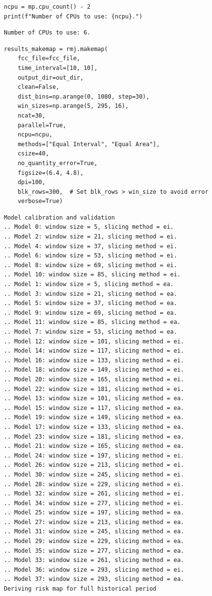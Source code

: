 \documentclass[paper=a4, 12pt, DIV=12]{scrartcl}
\begin{document}
\begin{verbatim}
ncpu = mp.cpu_count() - 2
print(f"Number of CPUs to use: {ncpu}.") 
\end{verbatim}

\begin{verbatim}
Number of CPUs to use: 6.
\end{verbatim}


\begin{verbatim}
results_makemap = rmj.makemap(
    fcc_file=fcc_file,
    time_interval=[10, 10],
    output_dir=out_dir,
    clean=False,
    dist_bins=np.arange(0, 1080, step=30),
    win_sizes=np.arange(5, 295, 16),
    ncat=30,
    parallel=True,
    ncpu=ncpu,
    methods=["Equal Interval", "Equal Area"],
    csize=40,
    no_quantity_error=True,
    figsize=(6.4, 4.8),
    dpi=100,
    blk_rows=300,  # Set blk_rows > win_size to avoid error
    verbose=True)
\end{verbatim}

\begin{verbatim}
Model calibration and validation
.. Model 0: window size = 5, slicing method = ei.
.. Model 2: window size = 21, slicing method = ei.
.. Model 4: window size = 37, slicing method = ei.
.. Model 6: window size = 53, slicing method = ei.
.. Model 8: window size = 69, slicing method = ei.
.. Model 10: window size = 85, slicing method = ei.
.. Model 1: window size = 5, slicing method = ea.
.. Model 3: window size = 21, slicing method = ea.
.. Model 5: window size = 37, slicing method = ea.
.. Model 9: window size = 69, slicing method = ea.
.. Model 11: window size = 85, slicing method = ea.
.. Model 7: window size = 53, slicing method = ea.
.. Model 12: window size = 101, slicing method = ei.
.. Model 14: window size = 117, slicing method = ei.
.. Model 16: window size = 133, slicing method = ei.
.. Model 18: window size = 149, slicing method = ei.
.. Model 20: window size = 165, slicing method = ei.
.. Model 22: window size = 181, slicing method = ei.
.. Model 13: window size = 101, slicing method = ea.
.. Model 15: window size = 117, slicing method = ea.
.. Model 19: window size = 149, slicing method = ea.
.. Model 17: window size = 133, slicing method = ea.
.. Model 23: window size = 181, slicing method = ea.
.. Model 21: window size = 165, slicing method = ea.
.. Model 24: window size = 197, slicing method = ei.
.. Model 26: window size = 213, slicing method = ei.
.. Model 30: window size = 245, slicing method = ei.
.. Model 28: window size = 229, slicing method = ei.
.. Model 32: window size = 261, slicing method = ei.
.. Model 34: window size = 277, slicing method = ei.
.. Model 25: window size = 197, slicing method = ea.
.. Model 27: window size = 213, slicing method = ea.
.. Model 31: window size = 245, slicing method = ea.
.. Model 29: window size = 229, slicing method = ea.
.. Model 35: window size = 277, slicing method = ea.
.. Model 33: window size = 261, slicing method = ea.
.. Model 36: window size = 293, slicing method = ei.
.. Model 37: window size = 293, slicing method = ea.
Deriving risk map for full historical period
\end{verbatim}
\end{document}
